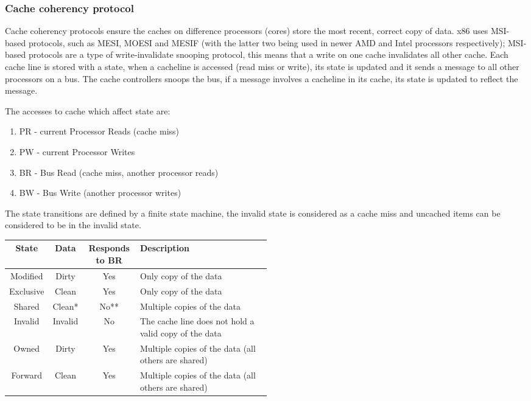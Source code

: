 \documentclass{article}
\newcommand{\layout}[1]{\parbox{\linewidth}{#1}}
\begin{document}
\layout{
  \subsubsection{Cache coherency protocol}

  Cache coherency protocols ensure the caches on difference processors (cores) store the most recent, correct copy of data.
  x86 uses MSI-based protocols, such as MESI, MOESI and MESIF (with the latter two being used in newer AMD and Intel processors respectively);
  MSI-based protocols are a type of write-invalidate snooping protocol, this means that a write on one cache invalidates all other cache.
  Each cache line is stored with a state, when a cacheline is accessed (read miss or write), its state is updated and it sends a message to all other processors on a bus.
  The cache controllers snoops the bus, if a message involves a cacheline in its cache, its state is updated to reflect the message.
} \bigskip

\layout{
  The accesses to cache which affect state are:
  \begin{enumerate}
    \item PR - current Processor Reads (cache miss)
    \item PW - current Processor Writes
    \item BR - Bus Read (cache miss, another processor reads)
    \item BW - Bus Write (another processor writes)
  \end{enumerate}
}

The state transitions are defined by a finite state machine, the invalid state is considered as a cache miss and uncached items can be considered to be in the invalid state.

\begin{table}[H]
  \centering
  \begin{tabular}{|c|c|c|p{0.5\linewidth}|}
    \hline \textbf{State} & \textbf{Data} & \textbf{Responds to BR} & \textbf{Description} \\ \hline
    Modified & Dirty & Yes & Only copy of the data \\
    Exclusive & Clean & Yes & Only copy of the data \\
    Shared & Clean* & No** & Multiple copies of the data \\
    Invalid & Invalid & No & The cache line does not hold a valid copy of the data \\
    Owned & Dirty & Yes & Multiple copies of the data (all others are shared) \\
    Forward & Clean & Yes & Multiple copies of the data (all others are shared) \\ \hline %
  \end{tabular}
\end{table}
\end{document}
